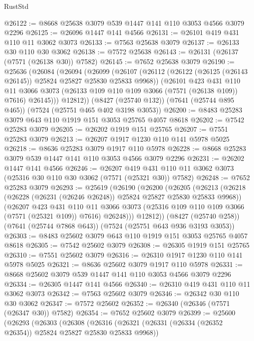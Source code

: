\begin{lexlean}{RustStd}
\begin{coremodule}
{\begin{coremodule}
{{{{{{{{{{{{{{{{{{{{{{{{{{{{{{{{@26122 := @8668 @25638 @3079 @539 @1447 @141 @110 @3053 @4566 @3079 @2296
@26125 := @26096 @1447 @141 @4566
@26131 := @26101 @419 @431 @110 @11 @3062 @3073
@26133 := @7563 @25638 @3079
@26137 := @26133 @30 @110 @30 @3062
@26138 := @7572 @25638
@26143 := @26131 (@26137 (@7571 (@26138 @30)) @7582)
@26145 := @7652 @25638 @3079
@26190 := @25636
    (@26084
      (@26094
        (@26099
          (@26107
            (@26112 (@26122 (@26125 (@26143 @26145)) @25824 @25827 @25830 @25833 @9968))
            (@26101
              @423
              @431
              @110
              @11
              @3066
              @3073
              (@26133 @109 @110 @109 @3066 (@7571 (@26138 @109)) @7616)
              @26145)))
        @12812))
    (@8427 (@25740 @132))
    (@7641 (@25744 @895 @465))
    (@7524 (@25751 @465 @402 @3198 @3053))
@26200 := @8483 @25283 @3079 @643 @110 @1919 @151 @3053 @25765 @4057 @8618
@26202 := @7542 @25283 @3079
@26205 := @26202 @1919 @151 @25765
@26207 := @7551 @25283 @3079
@26213 := @26207 @1917 @1230 @110 @141 @5978 @5025
@26218 := @8636 @25283 @3079 @1917 @110 @5978
@26228 := @8668 @25283 @3079 @539 @1447 @141 @110 @3053 @4566 @3079 @2296
@26231 := @26202 @1447 @141 @4566
@26246 := @26207
    @419
    @431
    @110
    @11
    @3062
    @3073
    (@25316 @30 @110 @30 @3062 (@7571 (@25321 @30)) @7582)
@26248 := @7652 @25283 @3079
@26293 := @25619
    (@26190
      (@26200
        (@26205
          (@26213
            (@26218 (@26228 (@26231 (@26246 @26248)) @25824 @25827 @25830 @25833 @9968))
            (@26207
              @423
              @431
              @110
              @11
              @3066
              @3073
              (@25316 @109 @110 @109 @3066 (@7571 (@25321 @109)) @7616)
              @26248)))
        @12812))
    (@8427 (@25740 @258))
    (@7641 (@25744 @7868 @643))
    (@7524 (@25751 @643 @936 @3193 @3053))
@26303 := @8483 @25602 @3079 @643 @110 @1919 @151 @3053 @25765 @4057 @8618
@26305 := @7542 @25602 @3079
@26308 := @26305 @1919 @151 @25765
@26310 := @7551 @25602 @3079
@26316 := @26310 @1917 @1230 @110 @141 @5978 @5025
@26321 := @8636 @25602 @3079 @1917 @110 @5978
@26331 := @8668 @25602 @3079 @539 @1447 @141 @110 @3053 @4566 @3079 @2296
@26334 := @26305 @1447 @141 @4566
@26340 := @26310 @419 @431 @110 @11 @3062 @3073
@26342 := @7563 @25602 @3079
@26346 := @26342 @30 @110 @30 @3062
@26347 := @7572 @25602
@26352 := @26340 (@26346 (@7571 (@26347 @30)) @7582)
@26354 := @7652 @25602 @3079
@26399 := @25600
    (@26293
      (@26303
        (@26308
          (@26316
            (@26321 (@26331 (@26334 (@26352 @26354)) @25824 @25827 @25830 @25833 @9968))
}}}}}}}}}}}}}}}}}}}}}}}}}}}}}}}}
\end{coremodule}}
\end{coremodule}
\end{lexlean}
